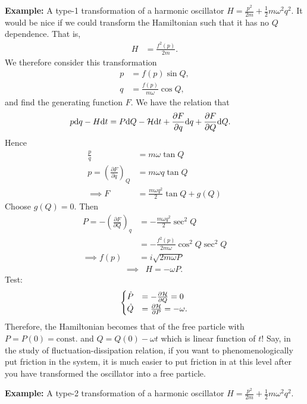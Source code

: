\textbf{Example: }A type-1 transformation of a harmonic oscillator
$H=\frac{p^{2}}{2m}+\frac{1}{2}m\omega^{2}q^{2}$. It would be nice
if we could transform the Hamiltonian such that it has no $Q$ dependence.
That is, 
\begin{align}
H & =\frac{f^{2}(p)}{2m}.
\end{align}
We therefore consider this transformation
\begin{align}
p & =f(p)\sin Q,\\
q & =\frac{f(p)}{m\omega}\cos Q,
\end{align}
and find the generating function $F$. We have the relation that
\begin{align}
p\mathrm{d} q -H\mathrm{d} t&= P\mathrm{d} Q -\mathcal{H}\mathrm{d} t + \frac{\partial {F}}{\partial {q}} \mathrm{d} q + \frac{\partial {F}}{\partial {Q}} \mathrm{d} Q.
\end{align}
Hence
\begin{align}
\frac{p}{q} & =m\omega\tan Q\\
p=\left(\frac{\partial F}{\partial q}\right)_{Q} & =m\omega q\tan Q\\
\implies F & =\frac{m\omega q^{2}}{2}\tan Q+g(Q)
\end{align}
Choose $g(Q)=0$. Then
\begin{align}
P=-\left(\frac{\partial F}{\partial Q}\right)_{q} & =-\frac{m\omega q^{2}}{2}\sec^{2}Q\\
 & =-\frac{f^{2}(p)}{2m\omega}\cos^{2}Q\sec^{2}Q\\
\implies f(p) & =i\sqrt{2m\omega P}
\end{align}
\begin{align}
\implies & \boxed{H=-\omega P}.
\end{align}
Test: 
\begin{align}
\begin{cases}
\dot{P} &= -\frac{\partial {\mathcal{H}}}{\partial {Q}} = 0\\
\dot{Q} &= \frac{\partial {\mathcal{H}}}{\partial {P}} = -\omega.
\end{cases}
\end{align}
Therefore, the Hamiltonian becomes that of the free particle with $P=P(0)=\text{const.}$ and
$Q=Q(0)-\omega t$ which is linear function of $ t $! Say, in the study of fluctuation-dissipation relation,
if you want to phenomenologically put friction in the system, it is
much easier to put friction in at this level after you have transformed
the oscillator into a free particle.

\textbf{Example: }A type-2 transformation of a harmonic oscillator
$H=\frac{p^{2}}{2m}+\frac{1}{2}m\omega^{2}q^{2}$.

